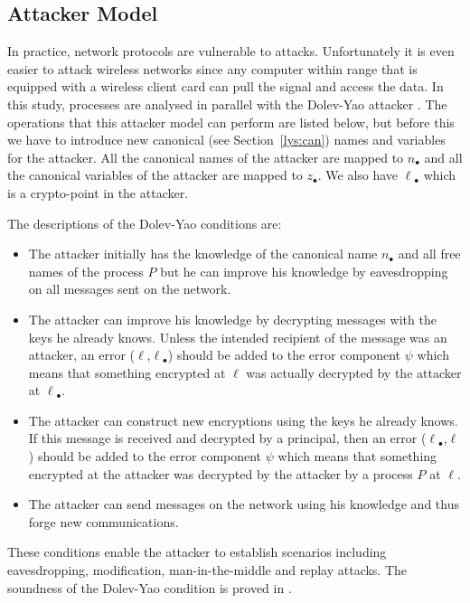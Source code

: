 \subsection{Attacker Model}
In practice, network protocols are vulnerable to attacks. 
Unfortunately it is even easier to attack wireless networks since any computer within range that is equipped with a wireless client card can pull the signal and access the data.
In this study, \LYSA processes are analysed in parallel with the Dolev-Yao attacker \cite{dol:yao}. 
The operations that this attacker model can perform are listed below, 
but before this we have to introduce new canonical (see Section~\ref{lys:can}) names and variables for the attacker.
All the canonical names of the attacker are mapped to $n_\bullet$ and all the canonical variables of the attacker are mapped to $z_\bullet$. 
We also have \(\ell\)$_\bullet$ which is a crypto-point in the attacker.

The descriptions of the Dolev-Yao conditions are:
\begin{itemize}
  \item The attacker initially has the knowledge of the canonical name $n_\bullet$ and all free names of the process $P$ but he can improve his knowledge by eavesdropping on all messages sent on the network.
  \item The attacker can improve his knowledge by decrypting messages with the keys he already knows. Unless the intended recipient of the message was an attacker, an error (\(\ell\),\(\ell\)$_\bullet$) should be added to the error component $\psi$ which means that something encrypted at \(\ell\) was actually decrypted by the attacker at \(\ell\)$_\bullet$.
  \item The attacker can construct new encryptions using the keys he already knows. If this message is received and decrypted by a principal, then an error (\(\ell\)$_\bullet$,\(\ell\)) should be added to the error component $\psi$
       which means that something encrypted at the attacker was decrypted by the attacker by a process $P$ at \(\ell\).
  \item The attacker can send messages on the network using his knowledge and thus forge new  communications.
\end{itemize}

These conditions enable the attacker to establish scenarios including eavesdropping, modification, man-in-the-middle and replay attacks. 
The soundness of the Dolev-Yao condition is proved in \cite{bod:1}.

